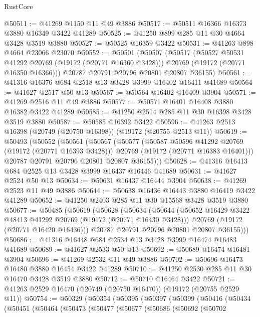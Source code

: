 \begin{lexlean}{RustCore}
\begin{coremodule}
@50511 := @41269 @1150 @11 @49 @3886
@50517 := @50511 @16366 @16373 @3880 @16349 @3422 @41289
@50525 := @41250 @899 @285 @11 @30 @4664 @3428 @3519 @3880
@50527 := @50525 @16359 @3422
@50531 := @41263 @898 @4664 @23066 @23070
@50552 := @50501
    (@50507
      (@50517
        (@50527 @50531 @41292 @20769 (@19172 (@20771 @16360 @3428)))
        @20769
        (@19172 (@20771 @16350 @16366)))
      @20787
      @20791
      @20796
      @20801
      @20807
      @36155)
@50561 := @41316 @16376 @684 @2518 @13 @3428 @3999 @16402 @16411 @41689
@50564 := @41627 @2517 @50 @13
@50567 := @50564 @16402 @16409 @3904
@50571 := @41269 @2516 @11 @49 @3886
@50577 := @50571 @16401 @16408 @3880 @16382 @3422 @41289
@50585 := @41250 @2514 @285 @11 @30 @16398 @3428 @3519 @3880
@50587 := @50585 @16392 @3422
@50596 := @41263 @2513 @16398 (@20749 (@20750 @16398)) (@19172 (@20755 @2513 @11))
@50619 := @50493
    (@50552
      (@50561
        (@50567
          (@50577
            (@50587 @50596 @41292 @20769 (@19172 (@20771 @16393 @3428)))
            @20769
            (@19172 (@20771 @16383 @16401)))
          @20787
          @20791
          @20796
          @20801
          @20807
          @36155)))
@50628 := @41316 @16413 @684 @2525 @13 @3428 @3999 @16437 @16446 @41689
@50631 := @41627 @2524 @50 @13
@50634 := @50631 @16437 @16444 @3904
@50638 := @41269 @2523 @11 @49 @3886
@50644 := @50638 @16436 @16443 @3880 @16419 @3422 @41289
@50652 := @41250 @2403 @285 @11 @30 @15568 @3428 @3519 @3880
@50677 := @50485
    (@50619
      (@50628
        (@50634
          (@50644
            (@50652 @16429 @3422 @48413 @41292 @20769 (@19172 (@20771 @16430 @3428)))
            @20769
            (@19172 (@20771 @16420 @16436)))
          @20787
          @20791
          @20796
          @20801
          @20807
          @36155)))
@50686 := @41316 @16448 @684 @2534 @13 @3428 @3999 @16474 @16483 @41689
@50689 := @41627 @2533 @50 @13
@50692 := @50689 @16474 @16481 @3904
@50696 := @41269 @2532 @11 @49 @3886
@50702 := @50696 @16473 @16480 @3880 @16454 @3422 @41289
@50710 := @41250 @2530 @285 @11 @30 @16470 @3428 @3519 @3880
@50712 := @50710 @16464 @3422
@50721 := @41263 @2529 @16470 (@20749 (@20750 @16470)) (@19172 (@20755 @2529 @11))
@50754 := @50329
    (@50354
      (@50395
        (@50397
          (@50399
            (@50416
              (@50434
                (@50451
                  (@50464
                    (@50473
                      (@50477
                        (@50677
                          (@50686
                            (@50692
                              (@50702

\end{coremodule}
\end{lexlean}

